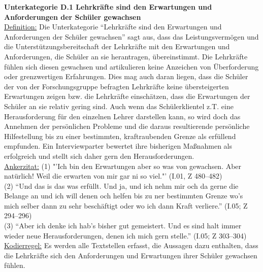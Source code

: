 \textbf{Unterkategorie D.1 Lehrkräfte sind den Erwartungen und Anforderungen der Schüler gewachsen}\\
\underline{Definition:} Die Unterkategorie "`Lehrkräfte sind den Erwartungen und Anforderungen der Schüler gewachsen"' sagt aus, dass das Leistungsvermögen und die Unterstützungsbereitschaft der Lehrkräfte mit den Erwartungen und Anforderungen, die Schüler an sie herantragen, übereinstimmt. Die Lehrkräfte fühlen sich diesen gewachsen und artikulieren keine Anzeichen von Überforderung oder grenzwertigen Erfahrungen. Dies mag auch daran liegen, dass die Schüler der von der Forschungsgruppe befragten Lehrkräfte keine übersteigerten Erwartungen zeigen bzw. die Lehrkräfte einschätzen, dass die Erwartungen der Schüler an sie relativ gering sind. Auch wenn das Schülerklientel z.T. eine Herausforderung für den einzelnen Lehrer darstellen kann, so wird doch das Annehmen der persönlichen Probleme und die daraus resultierende persönliche Hilfestellung bis zu einer bestimmten, kraftraubenden Grenze als erfüllend empfunden. Ein Interviewparter bewertet ihre bisherigen Maßnahmen als erfolgreich und stellt sich daher gern den Herausforderungen.\\
\underline{Ankerzitat:} (1) "'Ich bin den Erwartungen aber so was von gewachsen. Aber natürlich! Weil die erwarten von mir gar ni so viel."' (I.01, Z 480--482)\\ (2) "`Und das is das was erfüllt. Und ja, und ich nehm mir och da gerne die Belange an und ich will denen och helfen bis zu ner bestimmten Grenze wo's mich selber dann zu sehr beschäftigt oder wo ich dann Kraft verliere."' (I.05; Z 294--296)\\ (3) "`Aber ich denke ich hab's bisher gut gemeistert. Und es sind halt immer wieder neue Herausforderungen, denen ich mich gern stelle."' (I.05; Z 303--304)\\
\underline{Kodierregel:} Es werden alle Textstellen erfasst, die Aussagen dazu enthalten, dass die Lehrkräfte sich den Anforderungen und Erwartungen ihrer Schüler gewachsen fühlen. \\

